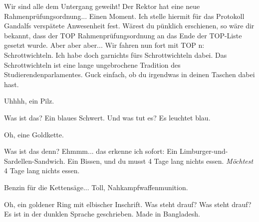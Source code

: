 \begin{verseplay}[10em]

\s{\Gandalf} Wir sind alle dem Untergang geweiht! Der Rektor hat  eine neue Rahmenprüfungsordnung...
\s{\Elron} Einen Moment. Ich stelle hiermit für das Protokoll Gandalfs verspätete Anwesenheit fest. Wärest du pünklich erschienen, so wäre dir bekannt, dass der TOP Rahmenprüfungsordnung an das Ende der TOP-Liste gesetzt wurde.
\s{\Gandalf} Aber aber aber...
\s{\Elron}  Wir fahren nun fort mit TOP n: Schrottwichteln.
\s{\Frodo} Ich habe doch garnichts fürs Schrottwichteln dabei.
\s{\Elron} Das Schrottwichteln ist eine lange ungebrochene Tradition des Studierendenparlamentes. 
\s{\Sum} Guck einfach, ob du irgendwas in deinen Taschen dabei hast.

\s{\Gandalf} Uhhhh, ein Pilz. 

\s{\Gimli} Was ist das?
\s{\Sum} Ein blaues Schwert.
\s{\Gimli} Und was tut es?
\s{\Sum} Es leuchtet blau. 

\s{\Frodo} Oh, eine Goldkette. 

\s{\Gimli}  Was ist das denn?
\s{\Frodo} Ehmmm... das erkenne ich sofort: Ein Limburger-und-Sardellen-Sandwich. Ein Bissen, und du musst 4 Tage lang nichts essen.
\s{\Elron}  \emph{Möchtest} 4 Tage lang nichts essen.

\s{\Legolars}  Benzin für die Kettensäge...  Toll, Nahkampfwaffenmunition. 

\s{\Elron} Oh, ein goldener Ring mit elbischer Inschrift.
\s{\Sum} Was steht drauf? Was steht drauf?
\s{\Elron} Es ist in der dunklen Sprache geschrieben.  Made in Bangladesh.


\end{verseplay}
